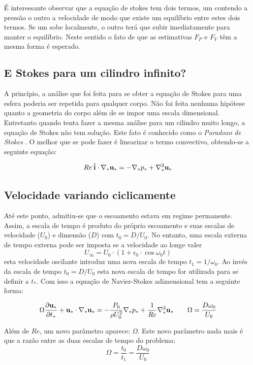 É interessante observar que a equação de stokes tem dois termos, um contendo a pressão o outro a velocidade de modo que existe um equilíbrio entre estes dois termos. Se um sobe localmente, o outro terá que subir imediatamente para manter o equilíbrio. Neste sentido o fato de que as estimativas $F_P$ e $F_V$ têm a mesma forma é esperado.

\subsection{E Stokes para um cilindro infinito?}
A princípio, a análise que foi feita para se obter a equação de Stokes para uma esfera poderia ser repetida para qualquer corpo. Não foi feita nenhuma hipótese quanto a geometria do corpo além de se impor uma escala dimensional. Entretanto quando tenta fazer a mesma análise para um cilindro muito longo, a equação de Stokes não tem solução. Este fato é conhecido como o \emph{Paradoxo de Stokes} \cite{Birkhoff60}. O melhor que se pode fazer é linearizar o termo convectivo, obtendo-se a seguinte equação:

\[
Re\:\hat{ \mathbf{i}}\cdot\nabla_* \mathbf{u_*} = -\nabla_* p_* + \nabla_*^2 \mathbf{u}_*
\]

\subsection{Velocidade variando ciclicamente}
Até este ponto, admitiu-se que o escoamento estava em regime permanente. Assim, a escala de tempo é produto do próprio escoamento e suas escalas de velocidade ($U_0$) e dimensão ($D$) com $t_0 = D/U_0$. No entanto, uma escala externa de tempo externa pode ser imposta se a velocidade ao longe valer
\[
U_\infty = U_0\cdot\left(1 + \epsilon_0\cdot\cos \omega_0 t\right)
\]
esta velocidade oscilante introduz uma nova escala de tempo $t_1 = 1/\omega_0$. Ao invés da escala de tempo $t_0 = D/U_0$ esta nova escala de tempo for utilizada para se definir a $t_*$. Com isso a equação de Navier-Stokes adimensional tem a seguinte forma:

\begin{equation}
\Omega\frac{\partial \mathbf{u}_*}{\partial t_*} +  \mathbf{u}_*\cdot\nabla_* \mathbf{u_*} = -\frac{P_0}{\rho U_0^2}\nabla_* p_* + \frac{1}{Re}\nabla_*^2 \mathbf{u}_*  \qquad \Omega = \frac{D\omega_0}{U_0}
\label{eq:nstemp}
\end{equation}

Além de $Re$, um novo parâmetro aparece: $\Omega$. Este novo parâmetro nada mais é que a razão entre as duas escalas de tempo do problema:
\[
\Omega = \frac{t_0}{t_1} = \frac{D\omega_0}{U_0}
\]


